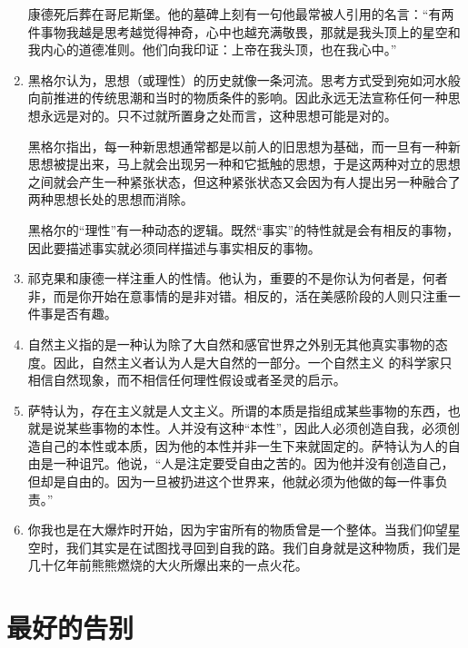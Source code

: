 \documentclass[UTF8]{ctexart}
\begin{document}
\begin{enumerate}
			康德死后葬在哥尼斯堡。他的墓碑上刻有一句他最常被人引用的名言：“有两件事物我越是思考越觉得神奇，心中也越充满敬畏，那就是我头顶上的星空和我内心的道德准则。他们向我印证：上帝在我头顶，也在我心中。”
			
			\item 黑格尔认为，思想（或理性）的历史就像一条河流。思考方式受到宛如河水般向前推进的传统思潮和当时的物质条件的影响。因此永远无法宣称任何一种思想永远是对的。只不过就所置身之处而言，这种思想可能是对的。
			
			黑格尔指出，每一种新思想通常都是以前人的旧思想为基础，而一旦有一种新思想被提出来，马上就会出现另一种和它抵触的思想，于是这两种对立的思想之间就会产生一种紧张状态，但这种紧张状态又会因为有人提出另一种融合了两种思想长处的思想而消除。
			
			黑格尔的“理性”有一种动态的逻辑。既然“事实”的特性就是会有相反的事物，因此要描述事实就必须同样描述与事实相反的事物。
			
			
			\item 祁克果和康德一样注重人的性情。他认为，重要的不是你认为何者是，何者非，而是你开始在意事情的是非对错。相反的，活在美感阶段的人则只注重一件事是否有趣。
			
			\item 自然主义指的是一种认为除了大自然和感官世界之外别无其他真实事物的态度。因此，自然主义者认为人是大自然的一部分。一个自然主义 的科学家只相信自然现象，而不相信任何理性假设或者圣灵的启示。
			
			\item 萨特认为，存在主义就是人文主义。所谓的本质是指组成某些事物的东西，也就是说某些事物的本性。人并没有这种“本性”，因此人必须创造自我，必须创造自己的本性或本质，因为他的本性并非一生下来就固定的。萨特认为人的自由是一种诅咒。他说，“人是注定要受自由之苦的。因为他并没有创造自己，但却是自由的。因为一旦被扔进这个世界来，他就必须为他做的每一件事负责。”
			
			\item 你我也是在大爆炸时开始，因为宇宙所有的物质曾是一个整体。当我们仰望星空时，我们其实是在试图找寻回到自我的路。我们自身就是这种物质，我们是几十亿年前熊熊燃烧的大火所爆出来的一点火花。
			
		\end{enumerate}
	
	\newpage
	
	\section{最好的告别}
	
	
\end{document}
